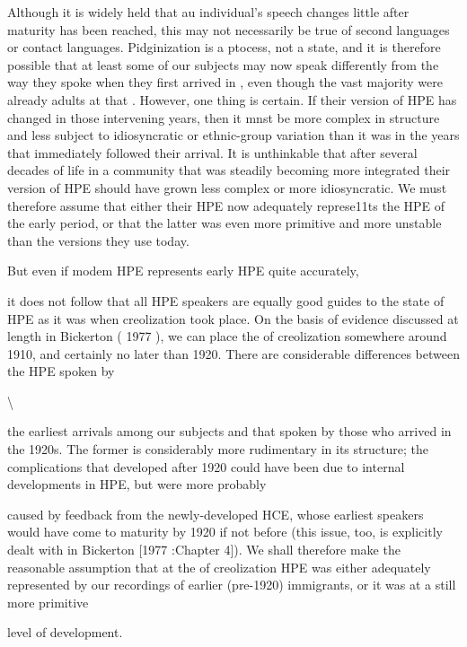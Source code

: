 Although it is widely held that au individual's speech changes little after maturity has been reached, this may not necessarily be true of second languages or contact languages. Pidginization is a ptocess, not a state, and it is therefore possible that at least some of our subjects may now speak differently from the way they spoke when they first arrived in , even though the vast majority were already adults at that . However, one thing is certain. If their version of HPE has changed in those intervening years, then it mnst be more complex in structure and less subject to idiosyncratic or ethnic-group variation than it was in the years that immediately followed their arrival. It is unthinkable that after several decades of life in a community that was steadily becoming more integrated their version of HPE should have grown less complex or more idiosyncratic. We must therefore assume that either their HPE now adequately represe11ts the HPE of the early  period, or that the latter was even more primitive and more unstable than the versions they use today.

But even if modem HPE represents early HPE quite accurately,

it does not follow that all HPE speakers are equally good guides to the state of HPE as it was when creolization took place. On the basis of evidence discussed at length in Bickerton ( 1977 ), we can place the  of creolization somewhere around 1910, and certainly no later than 1920. There are considerable differences between the HPE spoken by

{\textbackslash}

the earliest arrivals among our subjects and that spoken by those who arrived in the 1920s. The former is considerably more rudimentary in its structure; the complications that developed after 1920 could have been due to internal developments in HPE, but were more probably

caused by feedback from the newly-developed HCE, whose earliest speakers would have come to maturity by 1920 if not before (this issue, too, is explicitly dealt with in Bickerton [1977 :Chapter 4]). We shall therefore make the reasonable assumption that at the  of creolization HPE was either adequately represented by our recordings of earlier (pre-1920) immigrants, or it was at a still more primitive

level of development.

